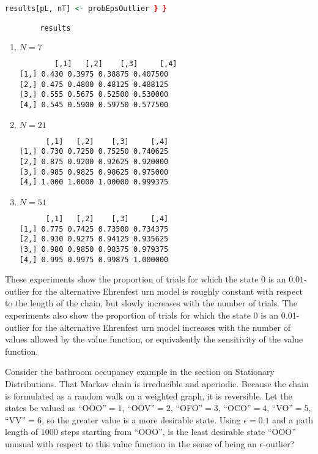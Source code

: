 \documentclass[12pt]{article}
\begin{document}
\begin{example}
\begin{solution}
\begin{lstlisting}[language=R]
        results[pL, nT] <- probEpsOutlier } }

        results
    \end{lstlisting}

    \begin{enumerate}
        \item
            \( N= 7 \)

\begin{verbatim}
        [,1]   [,2]    [,3]     [,4]
[1,] 0.430 0.3975 0.38875 0.407500
[2,] 0.475 0.4800 0.48125 0.488125
[3,] 0.555 0.5675 0.52500 0.530000
[4,] 0.545 0.5900 0.59750 0.577500
\end{verbatim}
        \item

            \( N = 21 \)

\begin{verbatim}
      [,1]   [,2]    [,3]     [,4]
[1,] 0.730 0.7250 0.75250 0.740625
[2,] 0.875 0.9200 0.92625 0.920000
[3,] 0.985 0.9825 0.98625 0.975000
[4,] 1.000 1.0000 1.00000 0.999375
\end{verbatim}

        \item
            \( N = 51 \)

\begin{verbatim}
      [,1]   [,2]    [,3]     [,4]
[1,] 0.775 0.7425 0.73500 0.734375
[2,] 0.930 0.9275 0.94125 0.935625
[3,] 0.980 0.9850 0.98375 0.979375
[4,] 0.995 0.9975 0.99875 1.000000
\end{verbatim}

    \end{enumerate}

    These experiments show the proportion of trials for which the state \(
    0 \) is an \( 0.01 \)-outlier for the alternative Ehrenfest urn
    model is roughly constant with respect to the length of the chain,
    but slowly increases with the number of trials.  The experiments
    also show the proportion of trials for which the state \( 0 \) is an
    \( 0.01 \)-outlier for the alternative Ehrenfest urn model increases
    with the number of values allowed by the value function, or
    equivalently the sensitivity of the value function.
\end{solution}

\begin{exercise}
    Consider the bathroom occupancy example in the section on Stationary
    Distributions.  That Markov chain is irreducible and aperiodic.
    Because the chain is formulated as a random walk on a weighted
    graph, it is reversible.  Let the states be valued as ``OOO''\( =1 \),
    ``OOV''\( =2 \), ``OFO''\( =3 \), ``OCO''\( =4 \), ``VO''\( =5 \),
    ``VV''\( =6 \), so the greater value is a more desirable state.
    Using \( \epsilon=0.1 \) and a path length of \( 1000 \) steps
    starting from ``OOO'', is the least desirable state ``OOO'' unusual
    with respect to this value function in the sense of being an \(
    \epsilon \)-outlier?


\end{exercise}
\end{example}
\end{document}

